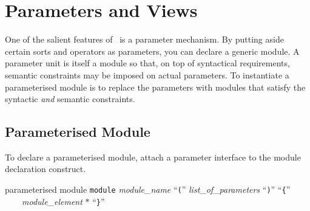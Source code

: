 \documentclass[a4paper]{memoir}
\begin{document}
%

\section{Parameters and Views}

One of the salient features of \cafeobj~is a parameter mechanism.
By putting aside certain sorts and operators as parameters,
you can declare a generic module. A parameter unit is itself a module
so that, on top of syntactical requirements, semantic constraints may
be imposed on actual parameters. To instantiate a parameterised module is
to replace the parameters with modules that satisfy the syntactic {\em and}
semantic constraints.

\subsection{Parameterised Module}\label{sec:p2-parameter}

To declare a parameterised module, attach a parameter interface
to the module declaration construct.

\begin{bsyntax} parameterised module  \Hline
\texttt{module} \textit{module\_name} ``\texttt{(}'' \textit{list\_of\_parameters} ``\texttt{)}'' ``\texttt{\{}''
~~~~\textit{module\_element} $*$
``\texttt{\}}''
\end{bsyntax}
\end{document}
